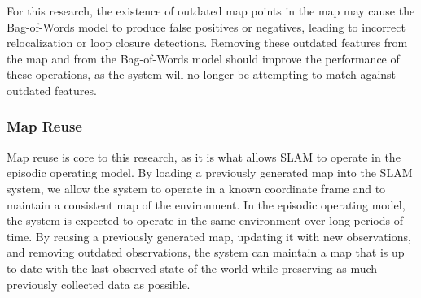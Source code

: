 For this research, the existence of outdated map points in the map may cause the Bag-of-Words model to produce false positives or negatives, leading to incorrect relocalization or loop closure detections. Removing these outdated features from the map and from the Bag-of-Words model should improve the performance of these operations, as the system will no longer be attempting to match against outdated features.

\subsubsection{Map Reuse}

Map reuse is core to this research, as it is what allows SLAM to operate in the episodic operating model. By loading a previously generated map into the SLAM system, we allow the system to operate in a known coordinate frame and to maintain a consistent map of the environment. In the episodic operating model, the system is expected to operate in the same environment over long periods of time. By reusing a previously generated map, updating it with new observations, and removing outdated observations, the system can maintain a map that is up to date with the last observed state of the world while preserving as much previously collected data as possible.
